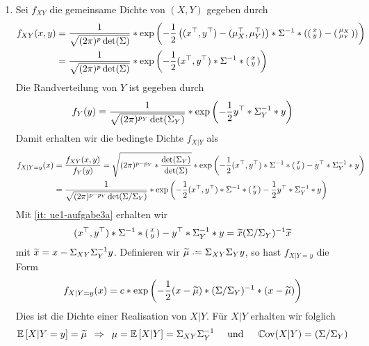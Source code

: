 \begin{exercisePage}
\begin{enumerate}[label=(\alph*)]
		
		
		\item Sei $f_{XY}$ die gemeinsame Dichte von $(X,Y)$ gegeben durch
		\begin{align*}
			f_{XY}(x,y) 
			&= \frac{1}{\sqrt{(2\pi)^p \det(\Sigma)}} * \exp\left( -\frac{1}{2} \left( (x^\top, y^\top) - (\mu_X^\top, \mu_Y^\top) \right) * \Sigma^{-1} * \left( \left(\begin{smallmatrix} x \\ y \end{smallmatrix}\right) - \left(\begin{smallmatrix} \mu_X \\ \mu_Y \end{smallmatrix} \right) \right) \right) \\
			&= \frac{1}{\sqrt{(2\pi)^p \det(\Sigma)}} * \exp\left( -\frac{1}{2} (x^\top, y^\top) * \Sigma^{-1} * \left(\begin{smallmatrix} x \\ y \end{smallmatrix}\right) \right)
		\end{align*}
		Die Randverteilung von $Y$ ist gegeben durch
		\begin{equation*}
			f_Y(y) = \frac{1}{\sqrt{(2\pi)^{p_Y} \det(\Sigma_Y)}} * \exp\left( -\frac{1}{2} y^\top * \Sigma_Y^{-1} * y \right)
		\end{equation*}
		Damit erhalten wir die bedingte Dichte $f_{X|Y}$ als
		\begin{align*}
			f_{X|Y=y}(x) &= \frac{f_{XY}(x,y)}{f_Y(y)} 
			= \sqrt{(2\pi)^{p - p_Y} * \frac{\det(\Sigma_Y)}{\det(\Sigma)}} * \exp\left( -\frac{1}{2} (x^\top, y^\top) * \Sigma^{-1} * \left(\begin{smallmatrix} x \\ y \end{smallmatrix}\right) - y^\top * \Sigma_Y^{-1} * y \right) \\
			&= \frac{1}{\sqrt{(2\pi)^{p - p_Y} \det(\Sigma / \Sigma_Y)}} * \exp\left( -\frac{1}{2} (x^\top, y^\top) * \Sigma^{-1} * \left(\begin{smallmatrix} x \\ y \end{smallmatrix}\right) - \frac{1}{2} y^\top * \Sigma_Y^{-1} * y \right)
		\end{align*}
		Mit \cref{it: ue1-aufgabe3a} erhalten wir
		\begin{equation*}
			(x^\top, y^\top) * \Sigma^{-1} * \left(\begin{smallmatrix} x \\ y \end{smallmatrix}\right) - y^\top * \Sigma_Y^{-1} * y
			= \widetilde{x} (\Sigma / \Sigma_Y)^{-1} \widetilde{x}
		\end{equation*}	
		mit $\widetilde{x} = x - \Sigma_{XY}\Sigma_Y^{-1} y$. Definieren wir $\schlange{\mu} \defeq \Sigma_{XY}\Sigma_Y y$, so hast $f_{X|Y=y}$ die Form
		\begin{equation*}
			f_{X|Y=y}(x) = c * \exp\left( -\frac{1}{2} (x - \widetilde{\mu}) * (\Sigma / \Sigma_Y)^{-1} * (x - \widetilde{\mu}) \right)
		\end{equation*}
		Dies ist die Dichte einer Realisation von $X|Y$. Für $X|Y$ erhalten wir folglich
		\begin{equation*}
			\mathbb{E} \left[ X | Y=y \right] = \widetilde{\mu} \enskip \Rightarrow \enskip \mu = \mathbb{E} \left[ X | Y \right] = \Sigma_{XY} \Sigma_Y^{-1} 
			\quad \text{ und } \quad
			\operatorname{\mathbb Cov}(X | Y) = (\Sigma / \Sigma_Y)
		\end{equation*}
	\end{enumerate}
	

\end{exercisePage}

